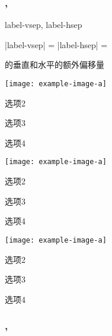 \documentclass{xdyy-usermanual}
\begin{document}
\subsubsection{ ,  }


\begin{function}{label-vsep, label-hsep}
  \begin{syntax}
    |label-vsep| =   \init{0pt}
    |label-hsep| =   \init{0pt}
  \end{syntax}
   的垂直和水平的额外偏移量
\end{function}

\begin{vexample}
    \begin{xchoices}[label-pos = left, label-hsep = 10pt]
      \item \texttt{[image: example-image-a]}
      \item 选项2
      \item 选项3
      \item 选项4
    \end{xchoices}
\end{vexample}

\begin{vexample}
    \begin{xchoices}[label-pos = left, label-hsep = 0pt]
      \item \texttt{[image: example-image-a]}
      \item 选项2
      \item 选项3
      \item 选项4
    \end{xchoices}
\end{vexample}
\begin{vexample}
    \begin{xchoices}[label-pos = left, label-vsep = 10pt]
      \item \texttt{[image: example-image-a]}
      \item 选项2
      \item 选项3
      \item 选项4
    \end{xchoices}
\end{vexample}


\subsubsection{ ,  }
\end{document}
